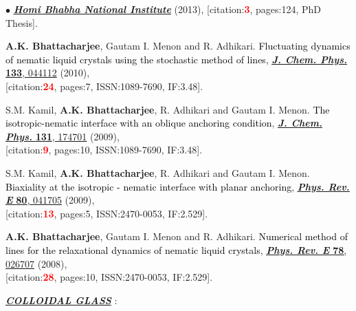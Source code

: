 \documentclass[margin,line]{res}
\newenvironment{list1}{
  \begin{list}{\ding{113}}{%
      \setlength{\itemsep}{0in}
      \setlength{\parsep}{0in} \setlength{\parskip}{0in}
      \setlength{\topsep}{0in} \setlength{\partopsep}{0in} 
      \setlength{\leftmargin}{0.17in}}}{\end{list}}
\newenvironment{list2}{
  \begin{list}{$\bullet$}{%
      \setlength{\itemsep}{0in}
      \setlength{\parsep}{0in} \setlength{\parskip}{0in}
      \setlength{\topsep}{0in} \setlength{\partopsep}{0in} 
      \setlength{\leftmargin}{0.2in}}}{\end{list}}
\begin{document}
\begin{resume}
\begin{list2}
{\href{http://www.hbni.ac.in/students/dsp_ths.html?nm=phys/PHYS10200604009.pdf}{\underline{\textbf{\textit{Homi Bhabha National Institute}}}} (2013), {[citation:\textcolor{red}{\bf 3}, pages:124, PhD Thesis]}}. 
\vspace{4mm}
\item {\bf A.K. Bhattacharjee}, Gautam I. Menon and R. Adhikari. \textcolor{black}{\textsf{Fluctuating dynamics of 
nematic liquid crystals using the stochastic method of lines}}, \href{https://aip.scitation.org/doi/abs/10.1063/1.3455206}{\underline{\textit{\textbf{J. Chem. Phys.}}} {\bf 133}, 044112} (2010), \\{[citation:\textcolor{red}{\bf 24}, pages:7, ISSN:1089-7690, IF:3.48]}.
\vspace{4mm}
\item S.M. Kamil, {\bf A.K. Bhattacharjee}, R. Adhikari and Gautam I. Menon. \textcolor{black}{\textsf{The isotropic-nematic 
interface with an oblique anchoring condition}}, \href{https://aip.scitation.org/doi/abs/10.1063/1.3253702}{\underline{\textit{\textbf{J. Chem. Phys.}}} 
{\bf 131}, 174701} (2009), \\{[citation:\textcolor{red}{\bf 9}, pages:10, ISSN:1089-7690, IF:3.48]}. 
\vspace{4mm}
\item S.M. Kamil, {\bf A.K. Bhattacharjee}, R. Adhikari and Gautam I. Menon. \textcolor{black}{\textsf{Biaxiality at the 
isotropic - nematic interface with planar anchoring}}, \href{http://pre.aps.org/abstract/PRE/v80/i4/e041705}{\underline{\textit{\textbf{ Phys. Rev. E} }}
{\bf 80}, 041705} (2009), \\{[citation:\textcolor{red}{\bf 13}, pages:5, ISSN:2470-0053, IF:2.529]}.
\vspace{4mm}
\item {\bf A.K. Bhattacharjee}, Gautam I. Menon and R. Adhikari. \textcolor{black}{\textsf{Numerical method of lines for 
the relaxational dynamics of nematic liquid crystals}}, \href{http://pre.aps.org/abstract/PRE/v78/i2/e026707}{\underline{\textit{\textbf{Phys. Rev. E}}}
{\bf 78}, 026707} (2008), \\{[citation:\textcolor{red}{\bf 28}, pages:10, ISSN:2470-0053, IF:2.529]}.
\end{list2}
\vspace{4mm}
\begin{list1}
\item[] \textcolor{alizarin}{\ul{\textbf{\textit{COLLOIDAL GLASS}}} :}
\end{list1}
\vspace{2mm}

\end{resume}
\end{document}
